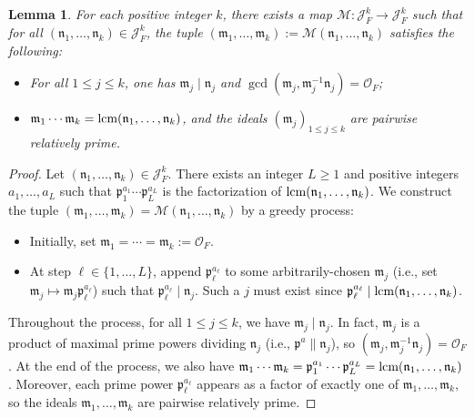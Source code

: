 \documentclass[11pt]{amsart}
\newtheorem{lemma}[theorem]{Lemma}
\newtheorem{example}[theorem]{Example}
\theoremstyle{remark}
\numberwithin{equation}{section}
\newcommand{\kp}{\mathfrak{p}}
\newcommand{\km}{\mathfrak{m}}
\newcommand{\kn}{\mathfrak{n}}
\newcommand{\Q}{\mathbb{Q}}
\newcommand{\mJ}{\mathcal{J}}
\newcommand{\mO}{\mathcal{O}}
\newcommand{\lcm}{\textnormal{lcm}}
\begin{document}
\begin{lemma}
\label{lem:decompose-ideals}
    For each positive integer $k$, there exists a map $ \mathscr{M}\colon \mJ_F^k \to \mJ_F^k$ such that for all $(\kn_1, \ldots, \kn_k) \in \mJ_F^k$, the tuple $(\km_1, \ldots, \km_k) := \mathscr{M}(\kn_1, \ldots, \kn_k)$ satisfies the following:
    \begin{itemize}
        \item[$(i)$] For all $1 \le j \le k$, one has $\km_j \mid \kn_j$ and $\gcd(\km_j, \km_j^{-1} \kn_j) = \mO_F$;
        \item[$(ii)$] $\km_1 \cdots \km_k = \lcm(\kn_1, \ldots, \kn_k)$, and the ideals $(\km_j)_{1 \le j \le k}$ are pairwise relatively prime.
    \end{itemize}
\end{lemma}

\begin{proof}
Let $(\kn_1, \ldots, \kn_k) \in \mJ_F^k$.  There exists an integer $L\geq 1$ and positive integers $a_1, \ldots, a_L$ such that $\kp_1^{a_1} \cdots \kp_L^{a_L}$ is the factorization of $\lcm(\kn_1, \ldots, \kn_k)$.  We construct the tuple $(\km_1, \ldots, \km_k) = \mathscr{M}(\kn_1, \ldots, \kn_k)$ by a greedy process: 
\begin{itemize} 
\item[1.] Initially, set $\km_1 = \cdots = \km_k := \mO_F$. 
\item[2.] At step $\ell \in \{1, \ldots, L\}$, append $\kp_\ell^{a_\ell}$ to some arbitrarily-chosen $\km_j$ (i.e., set $\km_j \mapsto \km_j \kp_\ell^{a_\ell}$) such that $\kp_\ell^{a_\ell} \mid \kn_j$. Such a $j$ must exist since $\kp_\ell^{a_\ell} \mid \lcm(\kn_1, \ldots, \kn_k)$.
\end{itemize}
Throughout the process, for all $1 \le j \le k$, we have $\km_j \mid \kn_j$. In fact, $\km_j$ is a product of maximal prime powers dividing $\kn_j$ (i.e., $\kp^a \| \kn_j$), so $(\km_j, \km_j^{-1}\kn_j) = \mO_F$.  At the end of the process, we also have $\km_1 \cdots \km_k = \kp_1^{a_1}\cdots \kp_L^{a_L} = \lcm(\kn_1, \ldots, \kn_k)$. Moreover, each prime power $\kp_\ell^{a_\ell}$ appears as a factor of exactly one of $\km_1, \ldots, \km_k$, so the ideals $\km_1,\ldots,\km_k$ are pairwise relatively prime.
\end{proof}

\end{document}
